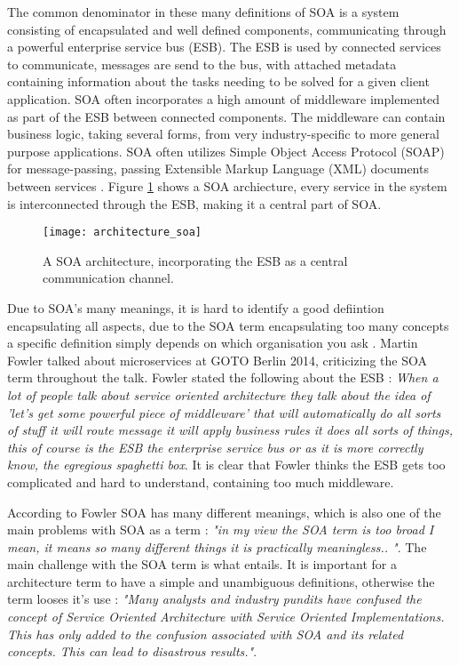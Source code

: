 The common denominator in these many definitions of SOA is a system consisting of encapsulated and well defined components, communicating through a powerful enterprise service bus (ESB). The ESB is used by connected services to communicate, messages are send to the bus, with attached metadata containing information about the tasks needing to be solved for a given client application. SOA often incorporates a high amount of middleware implemented as part of the ESB between connected components. The middleware can contain business logic, taking several forms, from very industry-specific to more general purpose applications. SOA often utilizes Simple Object Access Protocol (SOAP) for message-passing, passing Extensible Markup Language (XML) documents between services \cite[p.~272]{sosinsky2010cloud}. Figure \ref{fig:architecture_soa} shows a SOA archiecture, every service in the system is interconnected through the ESB, making it a central part of SOA.

\begin{figure}[!htb]
\begin{center} 
  \texttt{[image: architecture\_soa]}  
  \caption{A SOA architecture, incorporating the ESB as a central communication channel.}
  \label{fig:architecture_soa}
  \end{center}
\end{figure}

Due to SOA's many meanings, it is hard to identify a good defiintion encapsulating all aspects, due to the SOA term encapsulating too many concepts a specific definition simply depends on which organisation you ask \cite{microsoft2017chapter}. Martin Fowler talked about microservices at GOTO Berlin 2014, criticizing the SOA term throughout the talk. Fowler stated the following about the ESB \cite[t.8.15]{fowler2014microservicesoamonolith}:
\textit{When a lot of people talk about service oriented architecture they talk about the idea of 'let's get some powerful piece of middleware' that will automatically do all sorts of stuff it will route message it will apply business rules it does all sorts of things, this of course is the ESB the enterprise service bus or as it is more correctly know, the egregious spaghetti box}. It is clear that Fowler thinks the ESB gets too complicated and hard to understand, containing too much middleware. 

According to Fowler SOA has many different meanings, which is also one of the main problems with SOA as a term \cite[t.14:00]{fowler2014microservicesoamonolith}: \textit{"in my view the SOA term is too broad I mean, it means so many different things it is practically meaningless.. "}. The main challenge with the SOA term is what entails. It is important for a architecture term to have a simple and unambiguous definitions, otherwise the term looses it's use \cite{microsoft2017chapter}: \textit{"Many analysts and industry pundits have confused the concept of Service Oriented Architecture with Service Oriented Implementations. This has only added to the confusion associated with SOA and its related concepts. This can lead to disastrous results."}.

